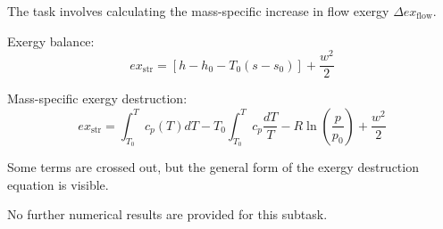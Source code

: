 The task involves calculating the mass-specific increase in flow exergy \( \Delta ex_{\text{flow}} \).  

Exergy balance:  
\[
ex_{\text{str}} = \left[ h - h_0 - T_0 (s - s_0) \right] + \frac{w^2}{2}
\]  

Mass-specific exergy destruction:  
\[
ex_{\text{str}} = \int_{T_0}^{T} c_p (T) dT - T_0 \int_{T_0}^{T} c_p \frac{dT}{T} - R \ln \left( \frac{p}{p_0} \right) + \frac{w^2}{2}
\]  

Some terms are crossed out, but the general form of the exergy destruction equation is visible.  

No further numerical results are provided for this subtask.